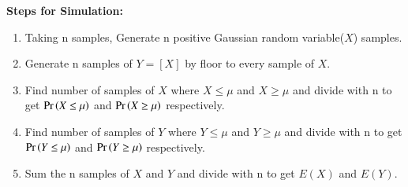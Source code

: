 \documentclass[journal,12pt,twocolumn]{IEEEtran}
\theoremstyle{remark}
\begin{document}
\textbf{Steps for Simulation:}\\
\begin{enumerate}
\item Taking n samples, Generate n positive Gaussian random variable($X$) samples.
\item Generate n samples of $Y=[X]$ by floor to every sample of $X$.
\item Find number of samples of $X$ where $X \leq \mu$ and $X \geq \mu$ and divide with n to get $\Pr\left(X \leq \mu\right)$ and $\Pr\left(X \geq \mu\right)$ respectively.
\item Find number of samples of $Y$ where $Y \leq \mu$ and $Y \geq \mu$ and divide with n to get $\Pr\left(Y \leq \mu\right)$ and $\Pr\left(Y \geq \mu\right)$ respectively.
\item Sum the n samples of $X$ and $Y$ and divide with n to get $E(X)$ and $E(Y)$.
\end{enumerate}
\end{document}
